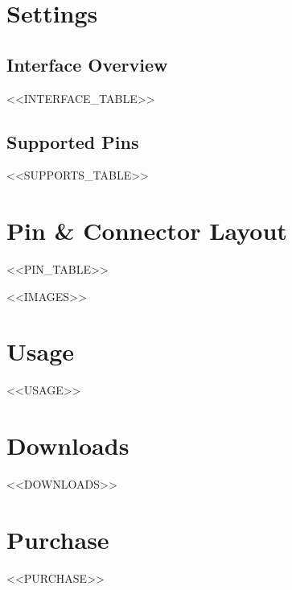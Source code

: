 \documentclass[10pt]{article}
\begin{document}
\vspace{1em}



\section*{Settings}

\subsection*{Interface Overview}
<<INTERFACE_TABLE>>

\subsection*{Supported Pins}
<<SUPPORTS_TABLE>>



\section*{Pin \& Connector Layout}
<<PIN_TABLE>>

\FloatBarrier
<<IMAGES>>


\section*{Usage}
<<USAGE>>

\section*{Downloads}

<<DOWNLOADS>>


\section*{Purchase}
<<PURCHASE>>
\end{document}

